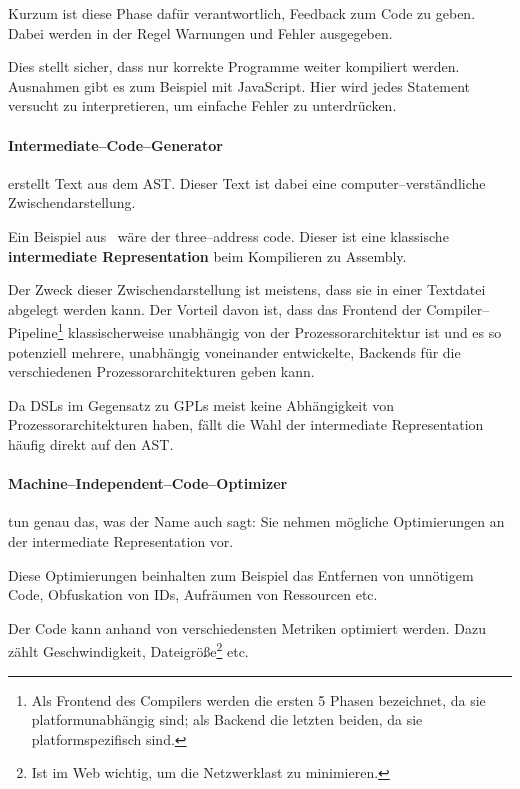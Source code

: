 Kurzum ist diese Phase dafür verantwortlich, Feedback zum Code zu geben.
Dabei werden in der Regel Warnungen und Fehler ausgegeben.

Dies stellt sicher, dass nur korrekte Programme weiter kompiliert werden.
Ausnahmen gibt es zum Beispiel mit JavaScript.
Hier wird jedes Statement versucht zu interpretieren, um einfache Fehler zu unterdrücken.~\autocite{larsen-2016}

\paragraph{Intermediate--Code--Generator} erstellt Text aus dem \ac{AST}.
Dieser Text ist dabei eine computer--verständliche Zwischendarstellung.

Ein Beispiel aus~\cite{aho-2006} wäre der three--address code.
Dieser ist eine klassische \textbf{intermediate Representation} beim Kompilieren zu Assembly.

Der Zweck dieser Zwischendarstellung ist meistens, dass sie in einer Textdatei abgelegt werden kann.
Der Vorteil davon ist, dass das Frontend der Compiler--Pipeline\footnote{Als Frontend des Compilers werden die ersten 5 Phasen bezeichnet, da sie platformunabhängig sind; als Backend die letzten beiden, da sie platformspezifisch sind.} klassischerweise unabhängig von der Prozessorarchitektur ist und es so potenziell mehrere, unabhängig voneinander entwickelte, Backends für die verschiedenen Prozessorarchitekturen geben kann.

Da \acp{DSL} im Gegensatz zu \acp{GPL} meist keine Abhängigkeit von Prozessorarchitekturen haben, fällt die Wahl der intermediate Representation häufig direkt auf den \ac{AST}.

\paragraph{Machine--Independent--Code--Optimizer}\label{par:machine-independent-code-optimizer} tun genau das, was der Name auch sagt: Sie nehmen mögliche Optimierungen an der intermediate Representation vor.

Diese Optimierungen beinhalten zum Beispiel das Entfernen von unnötigem Code, Obfuskation von \acp{ID}, Aufräumen von Ressourcen etc.

Der Code kann anhand von verschiedensten Metriken optimiert werden.
Dazu zählt Geschwindigkeit, Dateigröße\footnote{Ist im Web wichtig, um die Netzwerklast zu minimieren.} etc.~\autocite{aho-2006}

